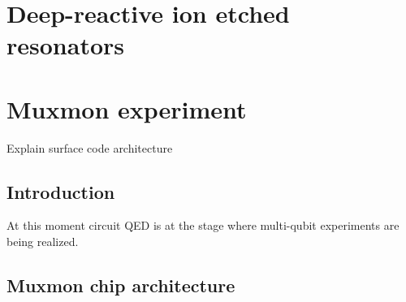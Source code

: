 \documentclass[12pt]{report}
\begin{document}
\chapter{Deep-reactive ion etched resonators}







\chapter{Muxmon experiment}

 Explain surface code architecture



\section{Introduction}

At this moment circuit QED is at the stage where multi-qubit experiments are being realized.



\section{Muxmon chip architecture}
\end{document}
